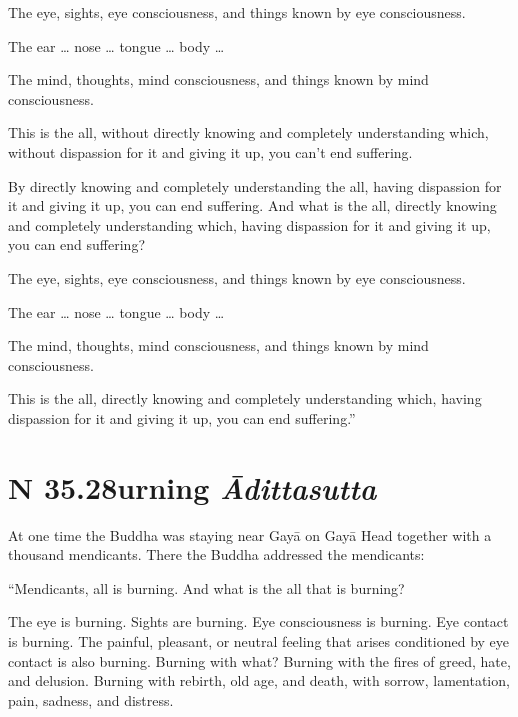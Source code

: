 \documentclass[12pt,openany]{book}%
\newcommand*{\suttatitleacronym}[1]{\smaller[2]{#1}\vspace*{.3em}}
\newcommand*{\suttatitletranslation}[1]{\linebreak{#1}}
\newcommand*{\suttatitleroot}[1]{\linebreak\smaller[2]\itshape{#1}}
\newcommand*{\tocacronym}[1]{\hspace*{-3.3em}{#1}\quad}
\newcommand*{\toctranslation}[1]{#1}
\newcommand*{\tocroot}[1]{(\textit{#1})}
\begin{document}
The eye, sights, eye consciousness, and things known by eye consciousness. 

The ear … nose … tongue … body … 

The mind, thoughts, mind consciousness, and things known by mind consciousness. 

This is the all, without directly knowing and completely understanding which, without dispassion for it and giving it up, you can’t end suffering. 

By directly knowing and completely understanding the all, having dispassion for it and giving it up, you can end suffering. And what is the all, directly knowing and completely understanding which, having dispassion for it and giving it up, you can end suffering? 

The eye, sights, eye consciousness, and things known by eye consciousness. 

The ear … nose … tongue … body … 

The mind, thoughts, mind consciousness, and things known by mind consciousness. 

This is the all, directly knowing and completely understanding which, having dispassion for it and giving it up, you can end suffering.” 

%
\section*{{\suttatitleacronym SN 35.28}{\suttatitletranslation Burning }{\suttatitleroot Ādittasutta}}
\addcontentsline{toc}{section}{\tocacronym{SN 35.28} \toctranslation{Burning } \tocroot{Ādittasutta}}

At one time the Buddha was staying near \textsanskrit{Gayā} on \textsanskrit{Gayā} Head together with a thousand mendicants. There the Buddha addressed the mendicants: 

“Mendicants, all is burning. And what is the all that is burning? 

The eye is burning. Sights are burning. Eye consciousness is burning. Eye contact is burning. The painful, pleasant, or neutral feeling that arises conditioned by eye contact is also burning. Burning with what? Burning with the fires of greed, hate, and delusion. Burning with rebirth, old age, and death, with sorrow, lamentation, pain, sadness, and distress. 
\end{document}
